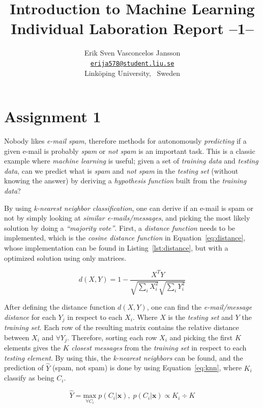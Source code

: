 \documentclass[a4paper, twocolumn]{article}
\title{Introduction to Machine Learning \\
       Individual Laboration Report --1--}
\author{{Erik Sven Vasconcelos Jansson} \\
        {\href{mailto:erija578@student.liu.se}
        {\texttt{erija578@student.liu.se}}} \\
        {Linköping University, \, Sweden}}
\begin{document}
    \maketitle %

    \section*{Assignment 1}

    Nobody likes \emph{e-mail spam}, therefore methods for autonomously \emph{predicting} if a given e-mail is probably \emph{spam} or \emph{not spam} is an important task. This is a classic example where \emph{machine learning} is useful; given a set of \emph{training data} and \emph{testing data}, can we predict what is \emph{spam} and \emph{not spam} in the \emph{testing set} (without knowing the answer) by deriving a \emph{hypothesis function} built from the \emph{training data}?

    By using \emph{k-nearest neighbor classification}, one can derive if an e-mail is spam or not by simply looking at \emph{similar e-mails/messages}, and picking the most likely solution by doing a \emph{``majority vote''}. First, a \emph{distance function} needs to be implemented, which is the \emph{cosine distance function} in Equation~\ref{eq:distance}, whose implementation can be found in Listing~\ref{lst:distance}, but with a optimized solution using only matrices.

    \begin{equation} \label{eq:distance}
        d(X,Y) = 1 - \frac{X^TY}{\sqrt{\sum_i{X_i^2}}\sqrt{\sum_i{Y_i^2}}}
    \end{equation}

    After defining the distance function $d(X,Y)$, one can find the \emph{e-mail/message distance} for each $Y_j$ in respect to each $X_i$. Where $X$ is the \emph{testing set} and $Y$ the \emph{training set}. Each row of the resulting matrix contains the relative distance between $X_i$ and $\forall Y_j$. Therefore, sorting each row $X_i$ and picking the first $K$ elements gives the $K$ \emph{closest messages} from the \emph{training set} in respect to each \emph{testing element}. By using this, the \emph{k-nearest neighbors} can be found, and the prediction of $\hat{Y}$ (spam, not spam) is done by using Equation~\ref{eq:knn}, where $K_i$ classify as being $C_i$.

    \begin{equation} \label{eq:knn}
        \hat{Y} = \underset{\forall C_i}{\mathrm{max}}\; p(C_i | \bm{x}),\; p(C_i | \bm{x}) \propto K_i \div K
    \end{equation}
\end{document}
